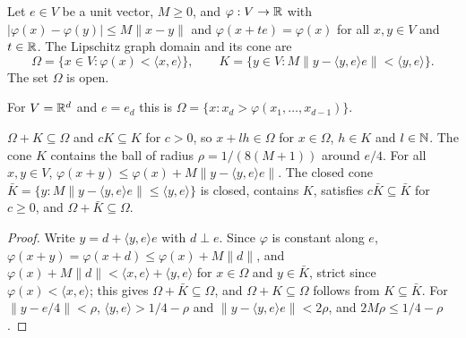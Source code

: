 \begin{definition}
\label{def:lipschitz-graph}
\leanok
Let $e \in V$ be a unit vector, $M \geq 0$, and $\varphi : V \to \mathbb{R}$ with
$|\varphi(x) - \varphi(y)| \leq M \|x - y\|$ and $\varphi(x + t e) = \varphi(x)$ for all
$x, y \in V$ and $t \in \mathbb{R}$. The Lipschitz graph domain and its cone are
\[
  \Omega = \{x \in V : \varphi(x) < \langle x, e \rangle\}, \qquad
  K = \{y \in V : M \|y - \langle y, e \rangle e\| < \langle y, e \rangle\} .
\]
The set $\Omega$ is open.
\end{definition}

For $V = \mathbb{R}^d$ and $e = e_d$ this is $\Omega = \{x : x_d > \varphi(x_1, \dots, x_{d-1})\}$.

\begin{lemma}
\label{lem:graph-cone}
\leanok
{}
$\Omega + K \subseteq \Omega$ and $c K \subseteq K$ for $c > 0$, so $x + l h \in \Omega$ for
$x \in \Omega$, $h \in K$ and $l \in \mathbb{N}$. The cone $K$ contains the ball of radius
$\rho = 1/(8(M + 1))$ around $e/4$. For all $x, y \in V$,
$\varphi(x + y) \leq \varphi(x) + M \|y - \langle y, e \rangle e\|$. The closed cone
$\bar K = \{y : M \|y - \langle y, e \rangle e\| \leq \langle y, e \rangle\}$ is closed, contains
$K$, satisfies $c \bar K \subseteq \bar K$ for $c \geq 0$, and $\Omega + \bar K \subseteq \Omega$.
\end{lemma}

\begin{proof}
\leanok
Write $y = d + \langle y, e \rangle e$ with $d \perp e$. Since $\varphi$ is constant along $e$,
$\varphi(x + y) = \varphi(x + d) \leq \varphi(x) + M \|d\|$, and
$\varphi(x) + M \|d\| < \langle x, e \rangle + \langle y, e \rangle$
for $x \in \Omega$ and $y \in \bar K$, strict since $\varphi(x) < \langle x, e \rangle$; this gives
$\Omega + \bar K \subseteq \Omega$, and $\Omega + K \subseteq \Omega$ follows from
$K \subseteq \bar K$. For $\|y - e/4\| < \rho$, $\langle y, e \rangle > 1/4 - \rho$ and
$\|y - \langle y, e \rangle e\| < 2\rho$, and $2 M \rho \leq 1/4 - \rho$.
\end{proof}

